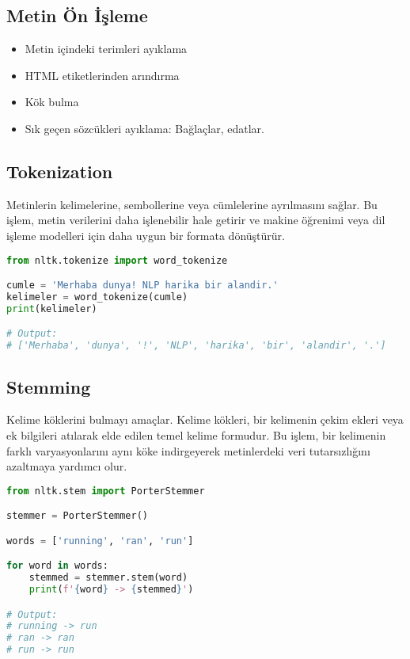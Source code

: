 \subsection{Metin Ön İşleme}
\begin{itemize}
    \item Metin içindeki terimleri ayıklama
    \item HTML etiketlerinden arındırma
    \item Kök bulma
    \item Sık geçen sözcükleri ayıklama: Bağlaçlar, edatlar.
\end{itemize}

\subsection{Tokenization}
Metinlerin kelimelerine, sembollerine veya cümlelerine ayrılmasını sağlar. Bu işlem, metin verilerini daha işlenebilir hale getirir ve makine öğrenimi veya dil işleme modelleri için daha uygun bir formata dönüştürür.

\begin{lstlisting}[language=Python]
from nltk.tokenize import word_tokenize

cumle = 'Merhaba dunya! NLP harika bir alandir.'
kelimeler = word_tokenize(cumle)
print(kelimeler)

# Output:
# ['Merhaba', 'dunya', '!', 'NLP', 'harika', 'bir', 'alandir', '.']
\end{lstlisting}

\subsection{Stemming}
Kelime köklerini bulmayı amaçlar. Kelime kökleri, bir kelimenin çekim ekleri veya ek bilgileri atılarak elde edilen temel kelime formudur. Bu işlem, bir kelimenin farklı varyasyonlarını aynı köke indirgeyerek metinlerdeki veri tutarsızlığını azaltmaya yardımcı olur.

\begin{lstlisting}[language=Python]
from nltk.stem import PorterStemmer

stemmer = PorterStemmer()

words = ['running', 'ran', 'run']

for word in words:
	stemmed = stemmer.stem(word)
	print(f'{word} -> {stemmed}')

# Output:
# running -> run
# ran -> ran
# run -> run
\end{lstlisting}

